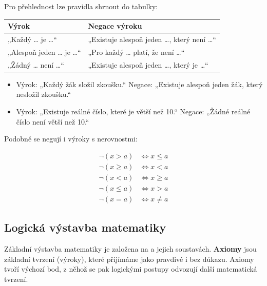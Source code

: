 \documentclass[12pt,a4paper]{article}
\begin{document}
Pro přehlednost lze pravidla shrnout do tabulky:
\begin{center}
\renewcommand{\arraystretch}{1.3}
\begin{tabular}{|C{6,5cm}|C{8cm}|}
\hline
{}
\textbf{Výrok} & \textbf{Negace výroku} \\
\hline
„Každý … je …“ & „Existuje alespoň jeden …, který není …“ \\
\hline
„Alespoň jeden … je …“ & „Pro každý … platí, že není …“ \\
\hline
„Žádný … není …“ & „Existuje alespoň jeden …, který je …“ \\
\hline
\end{tabular}
\end{center}

\begin{examplebox}
\begin{itemize}
    \item Výrok: „Každý žák složil zkoušku.“  
          Negace: „Existuje alespoň jeden žák, který nesložil zkoušku.“  
    \item Výrok: „Existuje reálné číslo, které je větší než 10.“  
          Negace: „Žádné reálné číslo není větší než 10.“  
\end{itemize}
\end{examplebox}

Podobně se negují i výroky s nerovnostmi: 

\begin{notebox}
\begin{align*}
\neg(x > a) &\Leftrightarrow x \leq a \\
\neg(x \geq a) &\Leftrightarrow x < a \\
\neg(x < a) &\Leftrightarrow x \geq a \\
\neg(x \leq a) &\Leftrightarrow x > a \\
\neg(x = a) &\Leftrightarrow x \neq a
\end{align*}
\end{notebox}

\subsection{Logická výstavba matematiky}

Základní výstavba matematiky je založena na  a jejich soustavách.  
\textbf{Axiomy} jsou základní tvrzení (výroky), které přijímáme jako pravdivé i bez důkazu.  
Axiomy tvoří výchozí bod, z něhož se pak logickými postupy odvozují další matematická tvrzení.  
\end{document}
